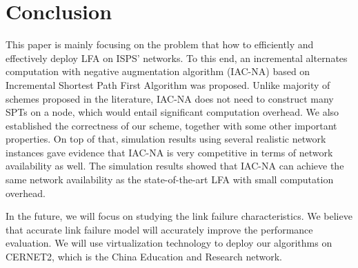 \section{Conclusion}\label{conclusion}
This paper is mainly focusing on the problem that how to efficiently
and effectively deploy LFA on ISPS' networks. 
To this end, an incremental alternates computation with negative augmentation algorithm (IAC-NA) based on Incremental Shortest Path First
Algorithm was proposed.
Unlike majority of
schemes proposed in the literature, IAC-NA does not need to construct many SPTs on a node, which would entail significant computation overhead.
We also established the correctness of our scheme,
together with some other important properties. On top of that,
simulation results using several realistic network instances
gave evidence that IAC-NA  is very competitive in terms of
network availability as well. 
The simulation results showed that IAC-NA can achieve
the same network availability as  the state-of-the-art LFA with small computation overhead.

In the future, we will focus on studying the link failure characteristics.
We believe that accurate link failure model will accurately improve  the performance evaluation.
We will use virtualization technology to deploy our algorithms on
CERNET2\cite{cernet}, which is the China Education and Research network.
